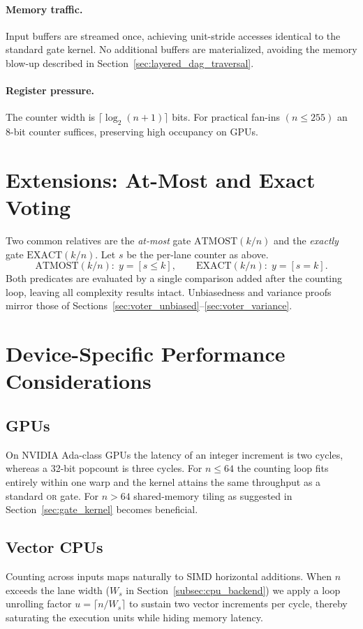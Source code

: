 \paragraph{Memory traffic.}  Input buffers are streamed once, achieving
unit-stride accesses identical to the standard gate kernel.  No additional
buffers are materialized, avoiding the memory blow-up described in
Section~\ref{sec:layered_dag_traversal}.

\paragraph{Register pressure.}  The counter width is $\lceil\log_2(n+1)\rceil$
bits.  For practical fan-ins $(n\le 255)$ an 8-bit counter suffices, preserving
high occupancy on GPUs.

\section{Extensions: At-Most and Exact Voting}
\label{sec:voter_extensions}

Two common relatives are the \emph{at-most} gate $\mathrm{ATMOST}(k/n)$ and the
\emph{exactly} gate $\mathrm{EXACT}(k/n)$.  Let $s$ be the per-lane counter as
above.
\[
  \mathrm{ATMOST}(k/n):\; y=[s\le k],
  \qquad
  \mathrm{EXACT}(k/n):\; y=[s = k].
\]
Both predicates are evaluated by a single comparison added after the counting
loop, leaving all complexity results intact.  Unbiasedness and variance proofs
mirror those of Sections~\ref{sec:voter_unbiased}–\ref{sec:voter_variance}.

\section{Device-Specific Performance Considerations}
\label{sec:voter_perf}

\subsection{GPUs}
On NVIDIA Ada-class GPUs the latency of an integer increment is two cycles,
whereas a 32-bit popcount is three cycles.  For $n\le 64$ the counting loop
fits entirely within one warp and the kernel attains the same throughput as a
standard \textsc{or} gate.  For $n>64$ shared-memory tiling as suggested in
Section~\ref{sec:gate_kernel} becomes beneficial.

\subsection{Vector CPUs}
Counting across inputs maps naturally to SIMD horizontal additions.  When $n$
exceeds the lane width ($W_s$ in Section~\ref{subsec:cpu_backend}) we apply a
loop unrolling factor $u=\lceil n/W_s\rceil$ to sustain two vector increments
per cycle, thereby saturating the execution units while hiding memory
latency.

